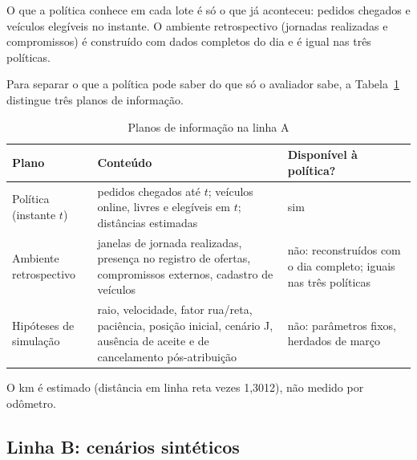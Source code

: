 O que a política conhece em cada lote é só o que já aconteceu: pedidos chegados e veículos elegíveis no instante. O ambiente retrospectivo (jornadas realizadas e compromissos) é construído com dados completos do dia e é igual nas três políticas.

Para separar o que a política pode saber do que só o avaliador sabe, a Tabela~\ref{tab:info} distingue três planos de informação.

\begin{table}[!htb]
\caption{Planos de informação na linha A}\label{tab:info}
\centering\fontetabela
\begin{tabular}{@{}p{34mm}p{62mm}p{52mm}@{}}
\toprule
Plano & Conteúdo & Disponível à política? \\
\midrule
Política (instante $t$) & pedidos chegados até $t$; veículos online, livres e elegíveis em $t$; distâncias estimadas & sim \\
Ambiente retrospectivo & janelas de jornada realizadas, presença no registro de ofertas, compromissos externos, cadastro de veículos & não: reconstruídos com o dia completo; iguais nas três políticas \\
Hipóteses de simulação & raio, velocidade, fator rua/reta, paciência, posição inicial, cenário J, ausência de aceite e de cancelamento pós-atribuição & não: parâmetros fixos, herdados de março \\
\bottomrule
\end{tabular}
\end{table} O km é estimado (distância em linha reta vezes 1,3012), não medido por odômetro.

\subsection{Linha B: cenários sintéticos}

